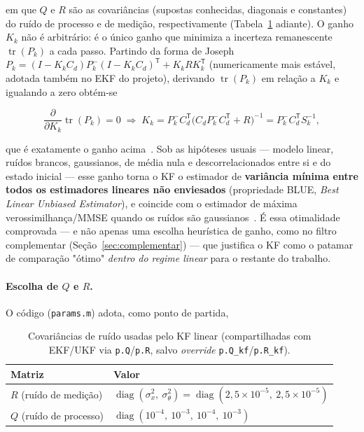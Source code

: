 \documentclass[brazil, 12pt]{article}
\begin{document}
em que $Q$ e $R$ são as covariâncias (supostas conhecidas, diagonais e
constantes) do ruído de processo e de medição, respectivamente
(Tabela~\ref{tab:params-qr} adiante). O ganho $K_k$ não é arbitrário: é o único
ganho que minimiza a incerteza remanescente $\operatorname{tr}(P_k)$ a cada
passo. Partindo da forma de Joseph
$P_k=(I-K_kC_d)P_k^{-}(I-K_kC_d)^{\mathsf T}+K_kRK_k^{\mathsf T}$ (numericamente
mais estável, adotada também no EKF do projeto), derivando
$\operatorname{tr}(P_k)$ em relação a $K_k$ e igualando a zero obtém-se

\[
\frac{\partial}{\partial K_k}\operatorname{tr}(P_k) = 0
\;\Longrightarrow\;
K_k = P_k^{-}C_d^{\mathsf T}\big(C_dP_k^{-}C_d^{\mathsf T}+R\big)^{-1} = P_k^{-}C_d^{\mathsf T}S_k^{-1},
\]

que é exatamente o ganho acima~\cite{simon2006}. Sob as hipóteses
usuais — modelo linear, ruídos brancos, gaussianos, de média nula e
descorrelacionados entre si e do estado inicial — esse ganho torna o KF o
estimador de \textbf{variância mínima entre todos os estimadores lineares não
enviesados} (propriedade BLUE, \emph{Best Linear Unbiased Estimator}), e
coincide com o estimador de máxima verossimilhança/MMSE quando os ruídos são
gaussianos~\cite{simon2006}. É essa otimalidade
comprovada — e não apenas uma escolha heurística de ganho, como no filtro
complementar (Seção~\ref{sec:complementar}) — que justifica o KF como o
patamar de comparação "ótimo" \emph{dentro do regime linear} para o restante do
trabalho.

\paragraph{Escolha de $Q$ e $R$.} O código (\texttt{params.m}) adota, como
ponto de partida,

\begin{table}[H]
\centering
\begin{tabular}{l l}
\hline
\textbf{Matriz} & \textbf{Valor} \\
\hline
$R$ (ruído de medição)  & $\operatorname{diag}(\sigma_x^2,\ \sigma_\theta^2) = \operatorname{diag}(2{,}5\times10^{-5},\ 2{,}5\times10^{-5})$ \\
$Q$ (ruído de processo) & $\operatorname{diag}(10^{-4},\ 10^{-3},\ 10^{-4},\ 10^{-3})$ \\
\hline
\end{tabular}
\caption{Covariâncias de ruído usadas pelo KF linear (compartilhadas com EKF/UKF
via \texttt{p.Q}/\texttt{p.R}, salvo \emph{override} \texttt{p.Q\_kf}/\texttt{p.R\_kf}).}
\label{tab:params-qr}
\end{table}
\end{document}
